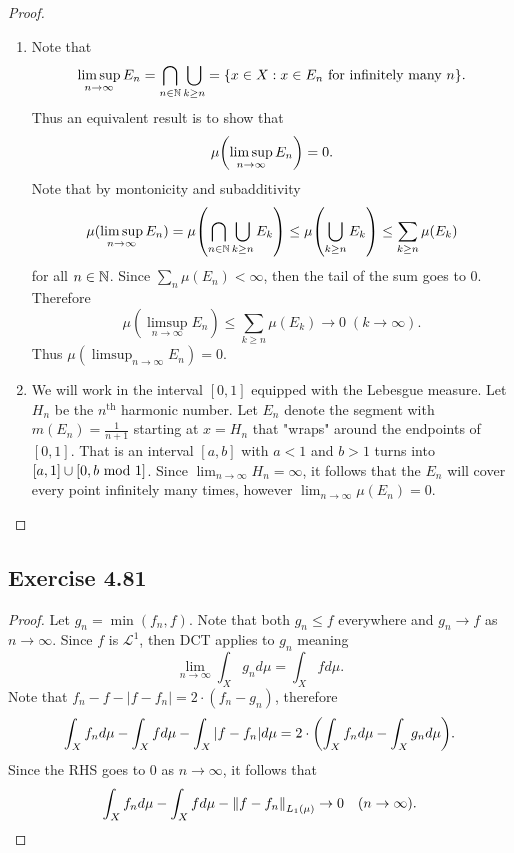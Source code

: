 \documentclass[hw_all.tex]{subfiles}
\begin{document}
\begin{proof}
    \begin{enumerate}
        \item 
            Note that
            \[
                \limsup_{n \to \infty} E_n = \bigcap_{n \in \mathbb{N}} \bigcup_{k \geq n} = \qty{ x \in X : x \in E_n \text{ for infinitely many } n }
            .\]
            Thus an equivalent result is to show that
            \[
                \mu\qty(\limsup_{n \to \infty} E_n) = 0
            .\]
            Note that by montonicity and subadditivity
            \[
                \mu(\limsup_{n \to \infty} E_n) = \mu\qty(\bigcap_{n \in \mathbb{N}} \bigcup_{k \geq n} E_k) \leq \mu\qty(\bigcup_{k \geq n} E_k) \leq \sum_{k \geq n} \mu(E_k)
            \]
            for all $n \in \mathbb{N}$. Since $\sum_n \mu(E_n) < \infty$, then the tail of the sum goes to $0$. Therefore
            \[
                \mu(\limsup_{n \to \infty} E_n) \leq \sum_{k \geq n} \mu(E_k) \to 0 \; (k \to \infty)
            .\]
            Thus $\mu(\limsup_{n \to \infty} E_n) = 0$.

        \item 
            We will work in the interval $[0,1]$ equipped with the Lebesgue measure. Let $H_n$ be the $n^\text{th}$ harmonic number. Let $E_n$ denote the segment with $m(E_n) = \frac{1}{n+1}$ starting at $x = H_n$ that "wraps" around the endpoints of $[0,1]$. That is an interval $[a,b]$ with $a < 1$ and $b > 1$ turns into $[a,1] \cup [0, b \ \mathrm{mod}\ 1]$. Since $\lim_{n \to \infty} H_n = \infty$, it follows that the $E_n$ will cover every point infinitely many times, however $\lim_{n \to \infty} \mu(E_n) = 0$.
    \end{enumerate}
\end{proof}

\subsection{Exercise 4.81}

\begin{proof}
    Let $g_n = \min(f_n, f)$. Note that both $g_n \leq f$ everywhere and $g_n \to f$ as $n \to \infty$. Since $f$ is $\mathcal{L}^1$, then DCT applies to $g_n$ meaning
    \[
        \lim_{n \to \infty} \int_X g_n d \mu = \int_X f d \mu
    .\]
    Note that $f_n - f - |f - f_n| = 2 \cdot (f_n - g_n)$, therefore
    \[
        \int_X f_n d \mu - \int_X f d \mu - \int_X |f - f_n| d \mu = 2 \cdot \qty(\int_X f_n d \mu - \int_X g_n d \mu)
    .\]
    Since the RHS goes to $0$ as $n \to \infty$, it follows that
    \[
        \int_X f_n d \mu - \int_X f d \mu - \norm{f - f_n}_{L_1(\mu)} \to 0 \quad (n \to \infty)
    .\]
\end{proof}
\end{document}
